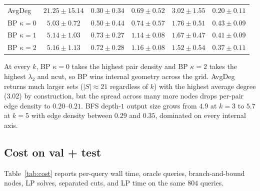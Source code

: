 \documentclass[11pt]{article}
\begin{document}
\begin{table}[t]
\begin{tabular}{lccccc}
AvgDeg            & $21.25 \pm 15.14$  & $0.30 \pm 0.34$ & $0.69 \pm 0.52$ & \underline{$3.02 \pm 1.55$} & $0.20 \pm 0.11$ \\
BP $\kappa{=}0$   & $5.03 \pm 0.72$    & $0.50 \pm 0.44$ & $0.74 \pm 0.57$ & $1.76 \pm 0.51$ & \underline{$0.43 \pm 0.09$} \\
BP $\kappa{=}1$   & $5.14 \pm 1.03$    & \underline{$0.73 \pm 0.27$} & $1.14 \pm 0.08$ & $1.67 \pm 0.47$ & $0.41 \pm 0.09$ \\
BP $\kappa{=}2$   & $5.16 \pm 1.13$    & $0.72 \pm 0.28$ & \underline{$1.16 \pm 0.08$} & $1.52 \pm 0.54$ & $0.37 \pm 0.11$ \\
\bottomrule
\end{tabular}
\end{table}

At every $k$, BP $\kappa = 0$ takes the highest pair density and BP
$\kappa = 2$ takes the highest $\lambda_2$ and ncut, so BP wins internal
geometry across the grid. AvgDeg returns much larger sets
($|S| \approx 21$ regardless of $k$) with the highest average degree
($3.02$) by construction, but the spread across many more nodes drops
per-pair edge density to $0.20$--$0.21$. BFS depth-$1$ output size grows
from $4.9$ at $k = 3$ to $5.7$ at $k = 5$ with edge density between
$0.29$ and $0.35$, dominated on every internal axis.

\subsection{Cost on val + test}
\label{sec:cost}

Table~\ref{tab:cost} reports per-query wall time, oracle queries,
branch-and-bound nodes, LP solves, separated cuts, and LP time on the
same $804$ queries.
\end{document}
